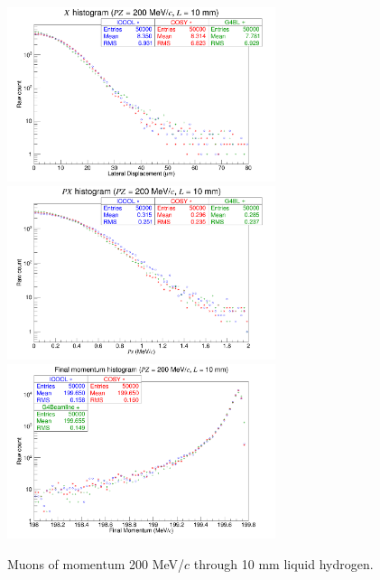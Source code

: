 \begin{figure}[H]
  \centering
    \includegraphics[width=0.7\textwidth]{Benchmarking/LH/X.200.10.png} 
    \includegraphics[width=0.7\textwidth]{Benchmarking/LH/PX.200.10.png} 
    \includegraphics[width=0.7\textwidth]{Benchmarking/LH/strag.200.10.png} 
  \caption{Muons of momentum 200 MeV/$c$ through 10 mm liquid hydrogen.}
  \label{fig:200.10}
\end{figure}

